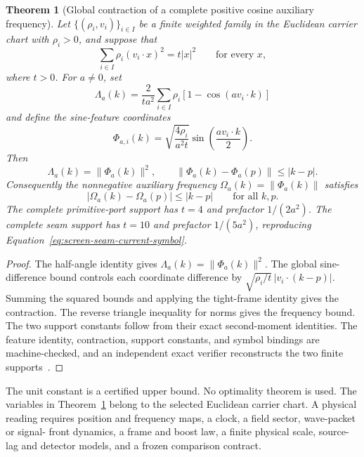 \documentclass[11pt]{article}
\newtheorem{theorem}{Theorem}[section]
\theoremstyle{remark}
\theoremstyle{plain}
\begin{document}
\begin{theorem}[Global contraction of a complete positive cosine auxiliary frequency]
\label{thm:positive-cosine-frequency-contraction}
Let \(\{(\rho_i,v_i)\}_{i\in I}\) be a finite weighted family in the
Euclidean carrier chart with \(\rho_i>0\), and suppose that
\[
\sum_{i\in I}\rho_i(v_i\mathbin{\cdot}x)^2=t|x|^2
\qquad\text{for every }x,
\]
where \(t>0\). For \(a\ne0\), set
\[
\Lambda_a(k)=\frac{2}{ta^2}\sum_{i\in I}\rho_i
 [1-\cos(av_i\mathbin{\cdot}k)]
\]
and define the sine-feature coordinates
\[
\Phi_{a,i}(k)=
 \sqrt{\frac{4\rho_i}{a^2t}}
 \sin\!\left(\frac{av_i\mathbin{\cdot}k}{2}\right).
\]
Then
\[
\Lambda_a(k)=\|\Phi_a(k)\|^2,
\qquad
\|\Phi_a(k)-\Phi_a(p)\|\le |k-p|.
\]
Consequently the nonnegative auxiliary frequency
\(\Omega_a(k)=\|\Phi_a(k)\|\) satisfies
\[
|\Omega_a(k)-\Omega_a(p)|\le |k-p|
\qquad\text{for all }k,p.
\]
The complete primitive-port support has \(t=4\) and prefactor
\(1/(2a^2)\). The complete seam support has \(t=10\) and prefactor
\(1/(5a^2)\), reproducing
Equation~\eqref{eq:screen-seam-current-symbol}.
\end{theorem}

\begin{proof}
The half-angle identity gives
\(\Lambda_a(k)=\|\Phi_a(k)\|^2\). The global sine-difference bound controls
each coordinate difference by
\(\sqrt{\rho_i/t}\,|v_i\mathbin{\cdot}(k-p)|\). Summing the squared bounds
and applying the tight-frame identity gives the contraction. The reverse
triangle inequality for norms gives the frequency bound. The two support
constants follow from their exact second-moment identities. The feature
identity, contraction, support constants, and symbol bindings are
machine-checked, and an independent exact verifier reconstructs the two
finite supports~\cite{ophrepo}.
\end{proof}

The unit constant is a certified upper bound. No optimality theorem is used.
The variables in Theorem~\ref{thm:positive-cosine-frequency-contraction}
belong to the selected Euclidean carrier chart. A physical reading requires
position and frequency maps, a clock, a field sector, wave-packet or signal-
front dynamics, a frame and boost law, a finite physical scale, source-lag
and detector models, and a frozen comparison contract.
\end{document}
